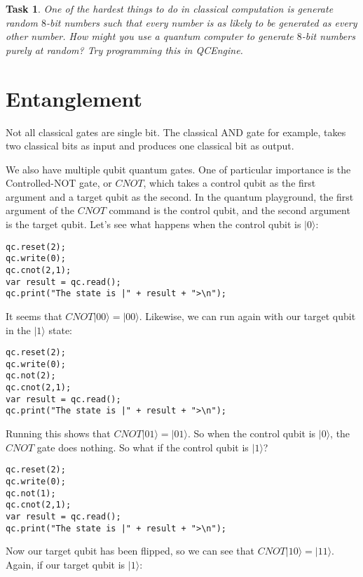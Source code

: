 \documentclass[twocolumn]{article}
\newtheorem{task}{Task}[section]
\begin{document}
\begin{task}
One of the hardest things to do in classical computation is generate random $8$-bit numbers such that every number is as likely to be generated as every other number. How might you use a quantum computer to generate $8$-bit numbers purely at random? Try programming this in QCEngine.
\end{task}

\section{Entanglement}
\label{sec:entanglement}

Not all classical gates are single bit. The classical AND gate for example, takes two classical bits as input and produces one classical bit as output.

We also have multiple qubit quantum gates. One of particular importance is the Controlled-NOT gate, or $CNOT$, which takes a control qubit as the first argument and a target qubit as the second. In the quantum playground, the first argument of the $CNOT$ command is the control qubit, and the second argument is the target qubit. Let's see what happens when the control qubit is $|0\rangle$:

\begin{lstlisting}
qc.reset(2);
qc.write(0);
qc.cnot(2,1);
var result = qc.read();
qc.print("The state is |" + result + ">\n");
\end{lstlisting}

It seems that $CNOT|00\rangle = |00\rangle$. Likewise, we can run again with our target qubit in the $|1\rangle$ state:

\begin{lstlisting}
qc.reset(2);
qc.write(0);
qc.not(2);
qc.cnot(2,1);
var result = qc.read();
qc.print("The state is |" + result + ">\n");
\end{lstlisting}

Running this shows that $CNOT|01\rangle = |01\rangle$. So when the control qubit is $|0\rangle$, the $CNOT$ gate does nothing. So what if the control qubit is $|1\rangle$?

\begin{lstlisting}
qc.reset(2);
qc.write(0);
qc.not(1);
qc.cnot(2,1);
var result = qc.read();
qc.print("The state is |" + result + ">\n");
\end{lstlisting}

Now our target qubit has been flipped, so we can see that $CNOT|10\rangle = |11\rangle$. Again, if our target qubit is $|1\rangle$:
\end{document}
